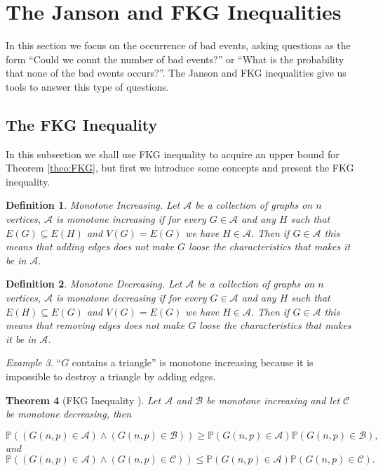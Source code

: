 \documentclass[12pt,twoside,a4paper,bibliography=totocnumbered]{book}
\numberwithin{equation}{section}
\newtheorem{theorem}             {Theorem}[section]
\newtheorem{definition}	[theorem] {Definition}
\theoremstyle{remark}
\newtheorem{example}	[theorem] {Example}
\begin{document}
\section{The Janson and FKG Inequalities}

In this section we focus on the occurrence of  bad events, asking questions as the form ``Could we count the number of bad events?'' or ``What is the probability that none of the bad events occurs?''. The Janson and FKG inequalities give us tools to answer this type of questions.

\subsection{The FKG Inequality}
In this subsection we shall use FKG inequality to acquire an upper bound for Theorem \ref{theo:FKG}, but first we introduce some concepts and present the FKG inequality.

\begin{definition}
Monotone Increasing. Let $\mathcal{A}$ be a collection of graphs on $n$ vertices, $\mathcal{A}$ is monotone increasing if for every $G \in \mathcal{A}$ and any $H$ such that $E(G) \subseteq E(H)$ and $V(G) = E(G)$ we have $H \in \mathcal{A}$. Then if $G \in \mathcal{A}$ this means that adding edges does not make $G$ loose the characteristics that makes it be in $\mathcal{A}$.     
\end{definition}

\begin{definition}
Monotone Decreasing. Let $\mathcal{A}$ be a collection of graphs on $n$ vertices, $\mathcal{A}$ is monotone decreasing if for every $G \in \mathcal{A}$ and any $H$ such that $E(H) \subseteq E(G)$ and $V(G) = E(G)$ we have $H \in \mathcal{A}$. Then if $G \in \mathcal{A}$ this means that removing edges does not make $G$ loose the characteristics that makes it be in $\mathcal{A}$.     
\end{definition}

\begin{example}
``$G$ contains a triangle'' is monotone increasing because it is impossible to destroy a triangle by adding edges.
\end{example}

\begin{theorem} [{FKG Inequality \cite{FKG71}}]
 Let $\mathcal{A}$ and $\mathcal{B}$ be monotone increasing and let $\mathcal{C}$ be monotone decreasing, then

$$ \mathbb{P}((G(n,p) \in \mathcal{A}) \wedge (G(n,p) \in \mathcal{B})) \geq \mathbb{P}(G(n,p) \in \mathcal{A})\mathbb{P}(G(n,p) \in \mathcal{B}),$$
and
$$ \mathbb{P}((G(n,p) \in \mathcal{A}) \wedge (G(n,p) \in \mathcal{C})) \leq \mathbb{P}(G(n,p) \in \mathcal{A})\mathbb{P}(G(n,p) \in \mathcal{C}).$$
\end{theorem}
\end{document}
